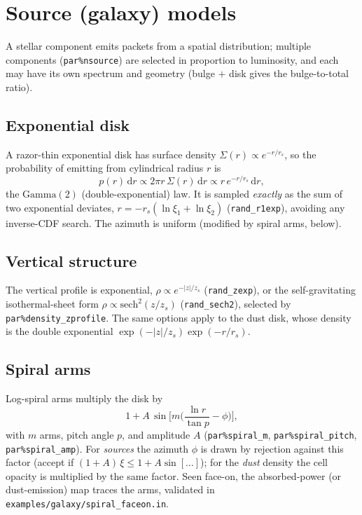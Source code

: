 \documentclass[english,a4paper]{kiseon_memo}
\newcommand{\dd}{\mathrm{d}}
\newcommand{\code}[1]{\texttt{#1}}
\newcommand{\file}[1]{\texttt{#1}}
\newcommand{\pp}[1]{\texttt{par\%#1}}
\begin{document}
\section{Source (galaxy) models}\label{sec:galaxy}

A stellar component emits packets from a spatial distribution; multiple
components (\pp{nsource}) are selected in proportion to luminosity, and each may
have its own spectrum and geometry (bulge $+$ disk gives the bulge-to-total
ratio).

\subsection{Exponential disk}
A razor-thin exponential disk has surface density
$\Sigma(r)\propto e^{-r/r_s}$, so the probability of emitting from cylindrical
radius $r$ is
\begin{equation}
  p(r)\,\dd r \propto 2\pi r\,\Sigma(r)\,\dd r \propto r\,e^{-r/r_s}\,\dd r,
\end{equation}
the $\mathrm{Gamma}(2)$ (double-exponential) law.  It is sampled \emph{exactly}
as the sum of two exponential deviates, $r=-r_s(\ln\xi_1+\ln\xi_2)$
(\code{rand\_r1exp}), avoiding any inverse-CDF search.  The azimuth is uniform
(modified by spiral arms, below).

\subsection{Vertical structure}
The vertical profile is exponential, $\rho\propto e^{-|z|/z_s}$
(\code{rand\_zexp}), or the self-gravitating isothermal-sheet form
$\rho\propto\mathrm{sech}^2(z/z_s)$ (\code{rand\_sech2}), selected by
\pp{density\_zprofile}.  The same options apply to the dust disk, whose density
is the double exponential $\exp(-|z|/z_s)\exp(-r/r_s)$.

\subsection{Spiral arms}
Log-spiral arms multiply the disk by
\begin{equation}
  1 + A\,\sin\!\Big[m\Big(\frac{\ln r}{\tan p}-\phi\Big)\Big],
\end{equation}
with $m$ arms, pitch angle $p$, and amplitude $A$ (\pp{spiral\_m},
\pp{spiral\_pitch}, \pp{spiral\_amp}).  For \emph{sources} the azimuth $\phi$ is
drawn by rejection against this factor (accept if
$(1+A)\,\xi\le 1+A\sin[\dots]$); for the \emph{dust} density the cell opacity is
multiplied by the same factor.  Seen face-on, the absorbed-power (or
dust-emission) map traces the arms, validated in
\file{examples/galaxy/spiral\_faceon.in}.
\end{document}
